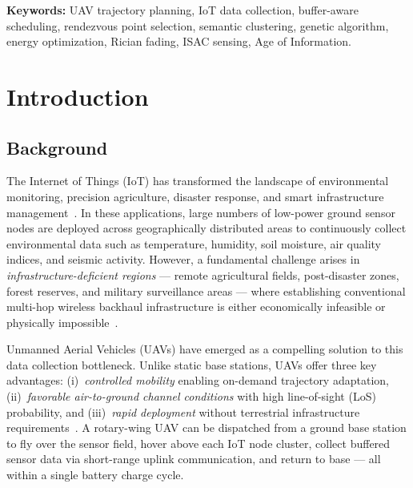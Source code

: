 \documentclass[12pt, a4paper, oneside]{report}
\begin{document}
\vspace{0.5cm}

\noindent\textbf{Keywords:} UAV trajectory planning, IoT data collection, buffer-aware scheduling, rendezvous point selection, semantic clustering, genetic algorithm, energy optimization, Rician fading, ISAC sensing, Age of Information.

\clearpage
\tableofcontents

\clearpage
\listoffigures

\clearpage
\listoftables

\clearpage
{}

\chapter{Introduction}
\label{ch:introduction}

\section{Background}

The Internet of Things (IoT) has transformed the landscape of environmental monitoring, precision agriculture, disaster response, and smart infrastructure management~\cite{gubbi2013iot, atzori2010iot}. In these applications, large numbers of low-power ground sensor nodes are deployed across geographically distributed areas to continuously collect environmental data such as temperature, humidity, soil moisture, air quality indices, and seismic activity. However, a fundamental challenge arises in \textit{infrastructure-deficient regions} --- remote agricultural fields, post-disaster zones, forest reserves, and military surveillance areas --- where establishing conventional multi-hop wireless backhaul infrastructure is either economically infeasible or physically impossible~\cite{mozaffari2019tutorial}.

Unmanned Aerial Vehicles (UAVs) have emerged as a compelling solution to this data collection bottleneck. Unlike static base stations, UAVs offer three key advantages: (i)~\textit{controlled mobility} enabling on-demand trajectory adaptation, (ii)~\textit{favorable air-to-ground channel conditions} with high line-of-sight (LoS) probability, and (iii)~\textit{rapid deployment} without terrestrial infrastructure requirements~\cite{zeng2019accessing}. A rotary-wing UAV can be dispatched from a ground base station to fly over the sensor field, hover above each IoT node cluster, collect buffered sensor data via short-range uplink communication, and return to base --- all within a single battery charge cycle.
\end{document}
